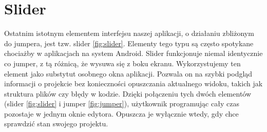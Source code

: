 \section{Slider}
Ostatnim istotnym elementem interfejsu naszej aplikacji, o działaniu zbliżonym do jumpera, jest tzw. slider \ref{fig:slider}. Elementy tego typu są często spotykane chociażby w aplikacjach na system Android. Slider funkcjonuje niemal identycznie co jumper, z tą różnicą, że wysuwa się z boku ekranu.
Wykorzystujemy ten element jako substytut osobnego okna aplikacji. Pozwala on na szybki podgląd informacji o projekcie bez konieczności opuszczania aktualnego widoku, takich jak struktura plików czy błędy w kodzie.
\newline\newline
Dzięki połączeniu tych dwóch elementów (slider \ref{fig:slider} i jumper \ref{fig:jumper}), użytkownik programując cały czas pozostaje w jednym oknie edytora. Opuszcza je wyłącznie wtedy, gdy chce sprawdzić stan swojego projektu.
